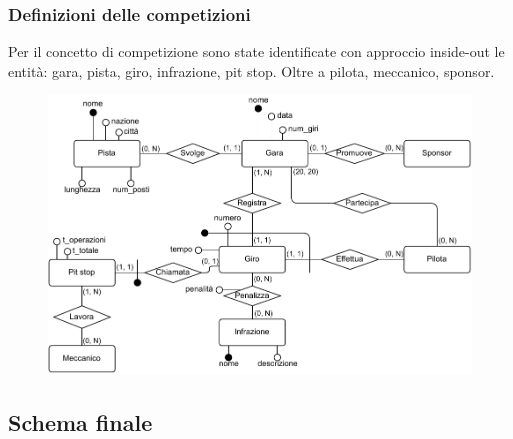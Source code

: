 \documentclass[11pt]{article}
\begin{document}
\subsubsection{Definizioni delle competizioni}
Per il concetto di competizione sono state identificate con approccio inside-out le entità: gara, pista, giro, infrazione, pit stop. Oltre a pilota, meccanico, sponsor.
\begin{figure}[H]
    \centering
    \includegraphics[width=15.5cm]{../er/gare_gara.pdf}
\end{figure}

\subsection{Schema finale}
\begin{figure}[H]
    \centering
\end{figure}
\end{document}
